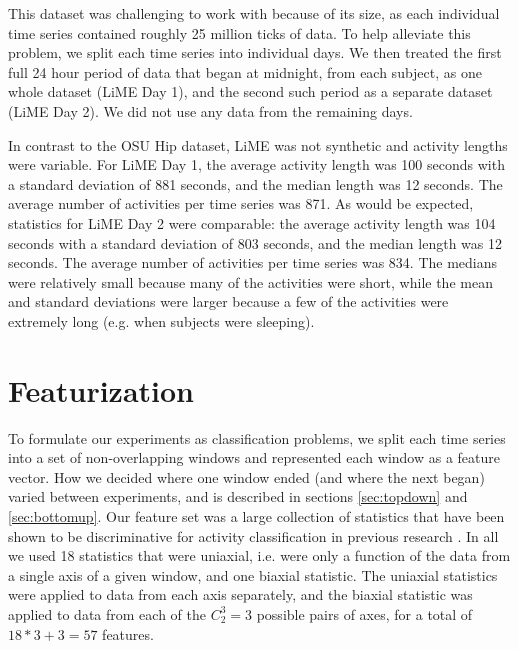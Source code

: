 
This dataset was challenging to work with because of its size, as each individual time series
contained roughly 25 million ticks of data. To help alleviate this problem, we split each
time series into individual days. We then treated the first full 24 hour period of data that began at midnight,
from each subject, as one whole dataset (LiME Day 1), and the second such period as a separate dataset
(LiME Day 2). We did not use any data from the remaining days.

In contrast to the OSU Hip dataset, LiME
was not synthetic and activity lengths were variable. For LiME Day 1, the
average activity length was 100 seconds with a standard deviation of 881 seconds, and the
median length was 12 seconds. The average number of activities per time series was
871. As would be expected, statistics for LiME Day 2 were comparable: the
average activity length was 104 seconds with a standard deviation of 803 seconds, and the
median length was 12 seconds. The average number of activities per time series was 834.
The medians were relatively small because many of the activities were short,
while the mean and standard deviations were larger because a few of the
activities were extremely long (e.g. when subjects were sleeping).

\section{Featurization}
To formulate our experiments as classification problems, we split each time series into a set of
non-overlapping windows and represented each window as a feature vector.
How we decided where one window ended (and where the next began) varied between
experiments, and is described in sections \ref{sec:topdown} and \ref{sec:bottomup}. Our feature
set was a large collection of statistics that have been shown to be discriminative
for activity classification in previous research \cite{li09} \cite{rothney07}
\cite{staudenmeyer09} \cite{zheng12}. In all we used 18 statistics that were
uniaxial, i.e. were only a function of the data from a single axis of a given window,
and one biaxial statistic.
The uniaxial statistics were applied to data from each axis separately, and
the biaxial statistic was applied to data from each of the $C_2^3=3$ possible pairs of
axes, for a total of $18*3+3 = 57$ features.

